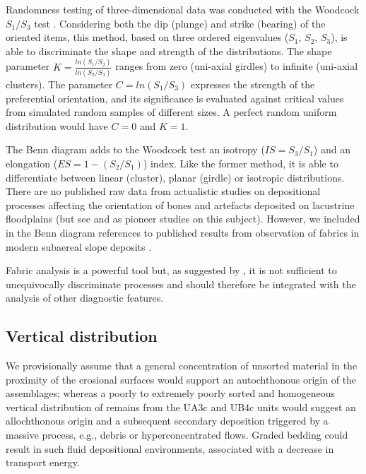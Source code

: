 \documentclass[review,authoryear,times]{elsarticle} %
\begin{document}
Randomness testing of three-dimensional data was conducted with the Woodcock $S_1/S_3$ test \citep{Woodcock1983}. Considering both the dip (plunge) and strike (bearing) of the oriented items, this method, based on three ordered eigenvalues ($S_1$, $S_2$, $S_3$), is able to discriminate the shape and strength of the distributions. The shape parameter $K=\frac{ln(S_1/S_2)}{ln(S_2/S_3)}$ ranges from zero (uni-axial girdles) to infinite (uni-axial clusters). The parameter $C=ln(S_1/S_3)$ expresses the strength of the preferential orientation, and its significance is evaluated against critical values from simulated random samples of different sizes. A perfect random uniform distribution would have $C=0$ and $K=1$. %

The Benn \citep{Benn1994} diagram adds to the Woodcock test an isotropy ($IS=S_3/S_1$) and an elongation ($ES=1-(S_2/S_1)$) index. Like the former method, it is able to differentiate between linear (cluster), planar (girdle) or isotropic distributions. There are no published raw data from actualistic studies on depositional processes affecting the orientation of bones and artefacts deposited on lacustrine floodplains (but see \cite{Morton2004} and \cite{Cobo-Sanchez2014} as pioneer studies on this subject). However, we included in the Benn diagram references to published results from observation of fabrics in modern subaereal slope deposits \citep{Bertran1997,Lenoble2004}.

Fabric analysis is a powerful tool but, as suggested by \cite{Lenoble2004}, it is not sufficient to unequivocally discriminate processes and should therefore be integrated with the analysis of other diagnostic features.

\subsection{Vertical distribution}

We provisionally assume that a general concentration of unsorted material in the proximity of the erosional surfaces would support an autochthonous origin of the assemblages; whereas a poorly to extremely poorly sorted and homogeneous vertical distribution of remains from the UA3c and UB4c units would suggest an allochthonous origin and a subsequent secondary deposition triggered by a massive process, e.g., debris or hyperconcentrated flows. Graded bedding could result in such fluid depositional environments, associated with a decrease in transport energy.
\end{document}
